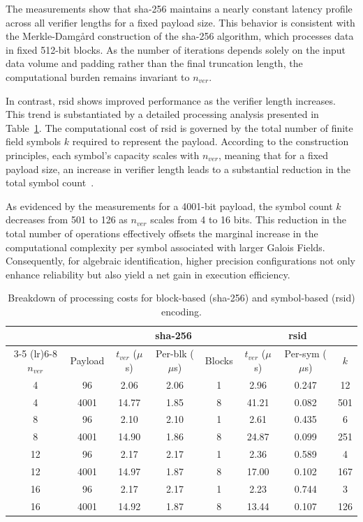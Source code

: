 \FloatBarrier

The measurements show that \gls{sha}-256 maintains a nearly constant latency profile across all verifier lengths for a fixed payload size. This behavior is consistent with the Merkle-Damgård construction of the \gls{sha}-256 algorithm, which processes data in fixed 512-bit blocks. As the number of iterations depends solely on the input data volume and padding rather than the final truncation length, the computational burden remains invariant to $n_{ver}$. 

In contrast, \gls{rsid} shows improved performance as the verifier length increases. This trend is substantiated by a detailed processing analysis presented in Table~\ref{tab:encoding_latency_breakdown}. The computational cost of \gls{rsid} is governed by the total number of finite field symbols $k$ required to represent the payload. According to the  construction principles, each symbol's capacity scales with $n_{ver}$, meaning that for a fixed payload size, an increase in verifier length leads to a substantial reduction in the total symbol count~\cite{9789759}. 

As evidenced by the measurements for a 4001-bit payload, the symbol count $k$ decreases from 501 to 126 as $n_{ver}$ scales from 4 to 16 bits. This reduction in the total number of operations effectively offsets the marginal increase in the computational complexity per symbol associated with larger Galois Fields. Consequently, for algebraic identification, higher precision configurations not only enhance reliability but also yield a net gain in execution efficiency.

\begin{table}[!htbp]
    \centering
    \small
    \setlength{\tabcolsep}{5pt}
    \caption{Breakdown of processing costs for block-based (\gls{sha}-256) and symbol-based (\gls{rsid}) encoding.}
    \label{tab:encoding_latency_breakdown}
    \begin{tabular}{cccccccc}
        \toprule
        & & \multicolumn{3}{c}{\gls{sha}-256} & \multicolumn{3}{c}{\gls{rsid}} \\
        \cmidrule(lr){3-5} \cmidrule(lr){6-8}
        $n_{ver}$ & Payload & $t_{ver}$ ($\mu$s) & Per-blk ($\mu$s) & Blocks & $t_{ver}$ ($\mu$s) & Per-sym ($\mu$s) & \textbf{$k$} \\
        \midrule
        4 & 96 & 2.06 & 2.06 & 1 & 2.96 & 0.247 & 12 \\
        4 & 4001 & 14.77 & 1.85 & 8 & 41.21 & 0.082 & 501 \\
        8 & 96 & 2.10 & 2.10 & 1 & 2.61 & 0.435 & 6 \\
        8 & 4001 & 14.90 & 1.86 & 8 & 24.87 & 0.099 & 251 \\
        12 & 96 & 2.17 & 2.17 & 1 & 2.36 & 0.589 & 4 \\
        12 & 4001 & 14.97 & 1.87 & 8 & 17.00 & 0.102 & 167 \\
        16 & 96 & 2.17 & 2.17 & 1 & 2.23 & 0.744 & 3 \\
        16 & 4001 & 14.92 & 1.87 & 8 & 13.44 & 0.107 & 126 \\
        \bottomrule
    \end{tabular}
\end{table}

